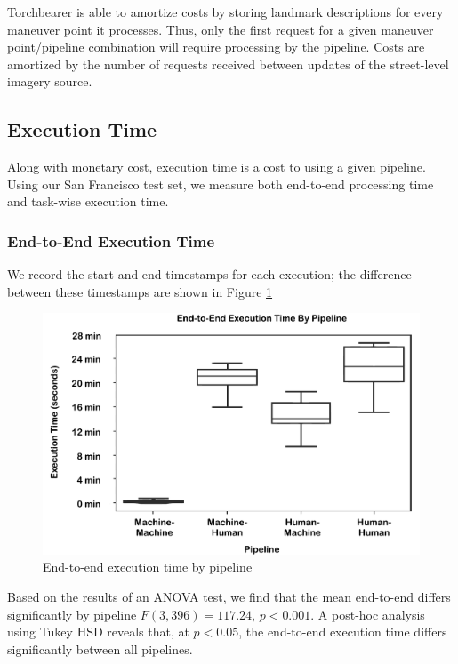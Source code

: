 Torchbearer is able to amortize costs by storing landmark descriptions for every maneuver point it processes. Thus, only the first request for a given maneuver point/pipeline combination will require processing by the pipeline. Costs are amortized by the number of requests received between updates of the street-level imagery source.

\subsection{Execution Time}
Along with monetary cost, execution time is a cost to using a given pipeline. Using our San Francisco test set, we measure both end-to-end processing time and task-wise execution time.

\subsubsection{End-to-End Execution Time}
We record the start and end timestamps for each execution; the difference between these timestamps are shown in Figure \ref{fig:plot:executiontime}

\begin{figure}[htbp]
  \centering
  \includegraphics[width=\textwidth]{images/plot_executiontime.pdf}
  \caption{End-to-end execution time by pipeline}
  \label{fig:plot:executiontime}
\end{figure}

Based on the results of an ANOVA test, we find that the mean end-to-end differs significantly by pipeline $F(3, 396)=117.24$, $p < 0.001$. A post-hoc analysis using Tukey HSD reveals that, at $p < 0.05$, the end-to-end execution time differs significantly between all pipelines.

